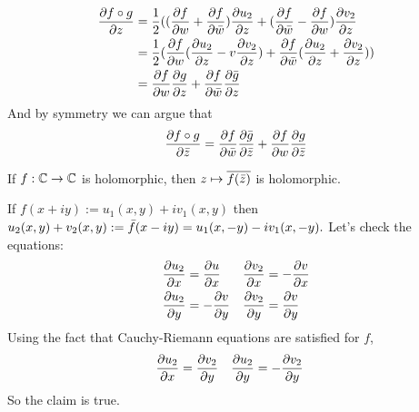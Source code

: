 \documentclass{homework}
\begin{document}
\begin{solution}
\begin{align*}
\frac{\partial f\circ g}{\partial z} &= \frac{1}{2}((\frac{\partial f}{\partial w} +\frac{\partial f}{\partial \bar{w}})\frac{\partial u_2}{\partial z} + (\frac{\partial f}{\partial \bar{w}} - \frac{\partial f}{\partial w})\frac{\partial v_2}{\partial z}\\
&= \frac{1}{2}(\frac{\partial f}{\partial w}(\frac{\partial u_2}{\partial z} - v\frac{\partial v_2}{\partial z}) + \frac{\partial f}{\partial \bar{w}}(\frac{\partial u_2}{\partial z} + \frac{\partial v_2}{\partial z}))\\
&= \frac{\partial f}{\partial w}\frac{\partial g}{\partial z} + \frac{\partial f}{\partial \bar{w}}\frac{\partial \bar{g}}{\partial z}
\end{align*}
And by symmetry we can argue that 
\[
\frac{\partial f\circ g}{\partial \bar{z}} =\frac{\partial f}{\partial \bar{w}}\frac{\partial \bar{g}}{\partial \bar{z}} + \frac{\partial f}{\partial w}\frac{\partial g}{\partial \bar{z}}
\]
\end{solution}


\begin{problem}\label{schwarz-reflection-principle}
If $f : \mathbb{C} \to \mathbb{C}$ is holomorphic, then $z \mapsto \overline{f(\bar{z})}$ is holomorphic.
\end{problem}
\begin{solution}
If $f(x+iy) := u_1(x, y) + iv_1(x, y)$ then $ u_2(x, y) + v_2(x, y) := \bar{f}(x - iy) = u_1(x, -y) - iv_1(x, -y).$ Let's check the equations:
\begin{align*}
\frac{\partial u_2}{\partial x} &= \frac{\partial u}{\partial x} &
\frac{\partial v_2}{\partial x} &= -\frac{\partial v}{\partial x}\\
\frac{\partial u_2}{\partial y} &= -\frac{\partial v}{\partial y} & 
\frac{\partial v_2}{\partial y} &= \frac{\partial v}{\partial y}\\
\end{align*}
Using the fact that Cauchy-Riemann equations are satisfied for $f$,
\begin{align*}
\frac{\partial u_2}{\partial x} &= \frac{\partial v_2}{\partial y} & 
\frac{\partial u_2}{\partial y} &= -\frac{\partial v_2}{\partial y}
\end{align*}
So the claim is true.
\end{solution}
\end{document}
